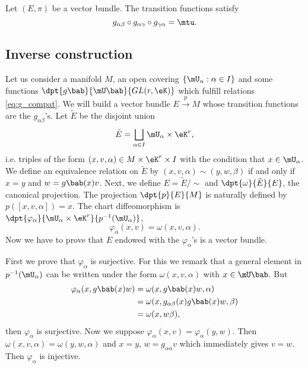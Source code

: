 \begin{proposition}
	Let \( (E,\pi)\) be a vector bundle. The transition functions satisfy
	\begin{equation}\label{eq:g_compat}
		g_{\alpha\beta}\circ g_{\alpha\gamma}\circ g_{\gamma\alpha}=\mtu.
	\end{equation}
\end{proposition}

\subsection{Inverse construction}\label{subsec:inv_g}

Let us consider a manifold $M$, an open covering $\{\mU_{\alpha}:\alpha\in I\}$ and some functions $\dpt{g\bab}{\mU\bab}{GL(r,\eK)}$ which fulfill relations \eqref{eq:g_compat}. We will build a vector bundle $E\stackrel{p}{\longrightarrow}M$ whose transition functions are the $g_{\alpha\beta}$'s. Let $\tilde{E}$ be the disjoint union
\[
	\tilde{E}=\bigsqcup_{\alpha\in I}\mU_{\alpha}\times\eK^r,
\]
i.e. triples of the form $(x,v,\alpha)\in M\times\eK^r\times I$ with the condition that $x\in\mU_{\alpha}$. We define an equivalence relation on $\tilde{E}$ by $(x,v,\alpha)\sim(y,w,\beta)$ if and only if $x=y$ and $w=g\bab(x)v$. Next, we define $E=\tilde{E}/\sim$ and $\dpt{\omega}{\tilde{E}}{E}$, the canonical projection. The projection $\dpt{p}{E}{M}$ is naturally defined by $p([x,v,\alpha])=x$. The chart diffeomorphism is $\dpt{\varphi_{\alpha}}{\mU_{\alpha}\times\eK^r}{p^{-1}(\mU_{\alpha})}$,
\[
	\varphi_{\alpha}(x,v)=\omega(x,v,\alpha).
\]
Now we have to prove that $E$ endowed with the $\varphi_{\alpha}$'s is a vector bundle.

First we prove that $\varphi_{\alpha}$ is surjective. For this we remark that a general element in $p^{-1}(\mU_{\alpha})$ can be written under the form $\omega(x,v,\alpha)$ with $x\in\mU\bab$. But
\begin{equation}
	\begin{split}
		\varphi_{\alpha}(x,g\bab(x)w)&=\omega(x,g\bab(x)w,\alpha)\\
		&=\omega(x,g_{\alpha\beta}(x)g\bab(x)w,\beta)\\
		&=\omega(x,w\beta),
	\end{split}
\end{equation}
then $\varphi_{\alpha}$ is surjective. Now we suppose $\varphi_{\alpha}(x,v)=\varphi_{\alpha}(y,w)$. Then $\omega(x,v,\alpha)=\omega(y,w,\alpha)$ and $x=y$, $w=g_{\alpha\alpha}v$ which immediately gives $v=w$. Then $\varphi_{\alpha}$ is injective.

